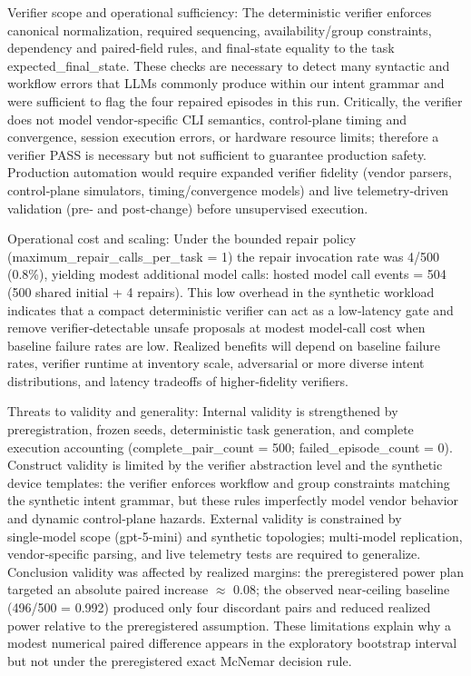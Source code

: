 \documentclass[conference]{IEEEtran}
\begin{document}
Verifier scope and operational sufficiency: The deterministic verifier enforces canonical normalization, required sequencing, availability/group constraints, dependency and paired‑field rules, and final‑state equality to the task expected\_final\_state. These checks are necessary to detect many syntactic and workflow errors that LLMs commonly produce within our intent grammar and were sufficient to flag the four repaired episodes in this run. Critically, the verifier does not model vendor‑specific CLI semantics, control‑plane timing and convergence, session execution errors, or hardware resource limits; therefore a verifier PASS is necessary but not sufficient to guarantee production safety. Production automation would require expanded verifier fidelity (vendor parsers, control‑plane simulators, timing/convergence models) and live telemetry‑driven validation (pre‑ and post‑change) before unsupervised execution.

Operational cost and scaling: Under the bounded repair policy (maximum\_repair\_calls\_per\_task = 1) the repair invocation rate was 4/500 (0.8\%), yielding modest additional model calls: hosted model call events = 504 (500 shared initial + 4 repairs). This low overhead in the synthetic workload indicates that a compact deterministic verifier can act as a low‑latency gate and remove verifier‑detectable unsafe proposals at modest model‑call cost when baseline failure rates are low. Realized benefits will depend on baseline failure rates, verifier runtime at inventory scale, adversarial or more diverse intent distributions, and latency tradeoffs of higher‑fidelity verifiers.

Threats to validity and generality: Internal validity is strengthened by preregistration, frozen seeds, deterministic task generation, and complete execution accounting (complete\_pair\_count = 500; failed\_episode\_count = 0). Construct validity is limited by the verifier abstraction level and the synthetic device templates: the verifier enforces workflow and group constraints matching the synthetic intent grammar, but these rules imperfectly model vendor behavior and dynamic control‑plane hazards. External validity is constrained by single‑model scope (gpt-5-mini) and synthetic topologies; multi‑model replication, vendor‑specific parsing, and live telemetry tests are required to generalize. Conclusion validity was affected by realized margins: the preregistered power plan targeted an absolute paired increase \ensuremath{\approx} 0.08; the observed near‑ceiling baseline (496/500 = 0.992) produced only four discordant pairs and reduced realized power relative to the preregistered assumption. These limitations explain why a modest numerical paired difference appears in the exploratory bootstrap interval but not under the preregistered exact McNemar decision rule.
\end{document}

